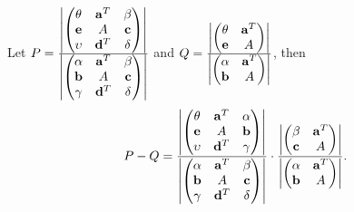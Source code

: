 \begin{lemma}
\label{Lem: 4-SCH-EXP}
Let $P = \frac{\left| \begin{pmatrix}
      \theta & \mathbf a^{T} & \beta  \\
        \mathbf e & A & \mathbf c \\
        \upsilon & \mathbf d^T & \delta 
    \end{pmatrix}\right|}{ \left| \begin{pmatrix}
      \alpha & \mathbf a^{T} & \beta  \\
        \mathbf b & A & \mathbf c \\
        \gamma & \mathbf d^T & \delta 
    \end{pmatrix}\right|  }$ and $Q =\frac{ \left| \begin{pmatrix}
      \theta & \mathbf a^{T} \\
        \mathbf e & A  
    \end{pmatrix}\right|  }{  \left| \begin{pmatrix}
      \alpha & \mathbf a^{T} \\
        \mathbf b & A  
    \end{pmatrix}\right|}$, then 
\begin{equation}
\begin{aligned}
P-Q = \frac{\left| \begin{pmatrix}
      \theta & \mathbf a^{T} & \alpha \\
        \mathbf e & A & \mathbf b \\
        \upsilon & \mathbf d^T & \gamma 
    \end{pmatrix}\right|}{ \left| \begin{pmatrix}
      \alpha & \mathbf a^{T} & \beta  \\
        \mathbf b & A & \mathbf c \\
        \gamma & \mathbf d^T & \delta 
    \end{pmatrix}\right|  } \cdot \frac{ \left| \begin{pmatrix}
      \beta & \mathbf a^{T} \\
        \mathbf c & A  
    \end{pmatrix}\right|  }{  \left| \begin{pmatrix}
      \alpha & \mathbf a^{T} \\
        \mathbf b & A  
    \end{pmatrix}\right|}.
\end{aligned}
\end{equation}
\end{lemma}
